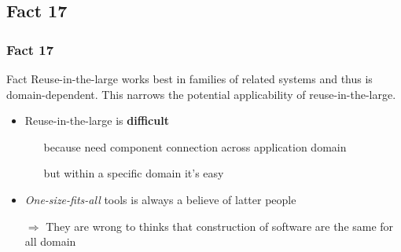 \documentclass{beamer}
\begin{document}
\subsection{Fact 17}
\begin{frame}
    \frametitle{Fact 17}
    \begin{block}{Fact}
    Reuse-in-the-large works best in families of related systems and thus is
    domain-dependent. This narrows the potential applicability of
    reuse-in-the-large.
    \end{block}

    \begin{itemize}

    \item Reuse-in-the-large is \textbf{difficult}
    \begin{itemize}
        \item[\alert{because}] need component connection across
            application domain
        \item[\alert{but}] within a specific domain it's easy
    \end{itemize}

    \item \textit{One-size-fits-all} tools is always a believe of latter
    people

        $\Rightarrow$ They are wrong to thinks that construction of
        software are the same for all domain

        \end{itemize}

\end{frame}
\end{document}
